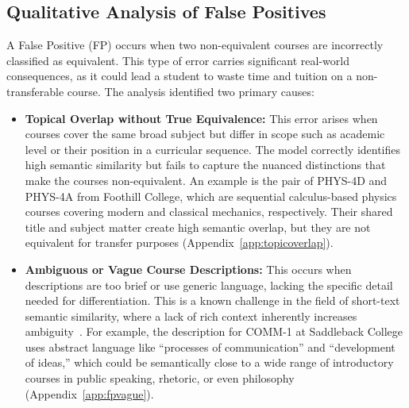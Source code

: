 \subsection{Qualitative Analysis of False Positives}\label{ch:4.6.2}
A False Positive (FP) occurs when two non-equivalent courses are incorrectly classified as equivalent. This type of error carries significant real-world consequences, as it could lead a student to waste time and tuition on a non-transferable course. The analysis identified two primary causes:
\begin{itemize}
    \item \textbf{Topical Overlap without True Equivalence:} This error arises when courses cover the same broad subject but differ in scope such as academic level or their position in a curricular sequence. The model correctly identifies high semantic similarity but fails to capture the nuanced distinctions that make the courses non-equivalent. An example is the pair of PHYS-4D and PHYS-4A from Foothill College, which are sequential calculus-based physics courses covering modern and classical mechanics, respectively. Their shared title and subject matter create high semantic overlap, but they are not equivalent for transfer purposes (Appendix~\ref{app:topicoverlap}).
    \item \textbf{Ambiguous or Vague Course Descriptions:} This occurs when descriptions are too brief or use generic language, lacking the specific detail needed for differentiation. This is a known challenge in the field of short-text semantic similarity, where a lack of rich context inherently increases ambiguity~\cite{app13063911}. For example, the description for COMM-1 at Saddleback College uses abstract language like ``processes of communication'' and ``development of ideas,'' which could be semantically close to a wide range of introductory courses in public speaking, rhetoric, or even philosophy (Appendix~\ref{app:fpvague}).
\end{itemize}

